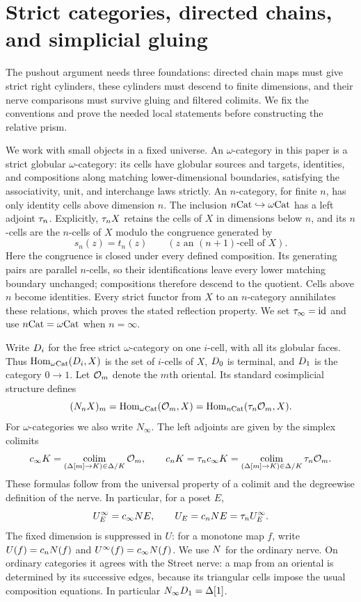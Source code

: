 \section{Strict categories, directed chains, and simplicial gluing}
\label{sec:foundations}

The pushout argument needs three foundations: directed chain maps must
give strict right cylinders, these cylinders must descend to finite
dimensions, and their nerve comparisons must survive gluing and filtered
colimits. We fix the conventions and prove the needed local statements
before constructing the relative prism.

We work with small objects in a fixed universe.  An $\omega$-category in
this paper is a strict globular $\omega$-category: its cells have globular
sources and targets, identities, and compositions along matching
lower-dimensional boundaries, satisfying the associativity, unit, and
interchange laws strictly.  An $n$-category, for finite $n$, has only
identity cells above dimension $n$.  The inclusion
$n\mathrm{Cat}\hookrightarrow\omega\mathrm{Cat}$ has a left adjoint $\tau_n$.
Explicitly, $\tau_n X$ retains the cells of $X$ in dimensions below $n$,
and its $n$-cells are the $n$-cells of $X$ modulo the congruence generated
by
\[
 s_n(z)=t_n(z)\qquad(z\text{ an }(n+1)\text{-cell of }X).
\]
Here the congruence is closed under every defined composition.  Its
generating pairs are parallel $n$-cells, so their identifications leave
every lower matching boundary unchanged; compositions therefore descend
to the quotient.  Cells above $n$ become identities.  Every strict functor from $X$ to an
$n$-category annihilates these relations, which proves the stated
reflection property.  We set $\tau_\infty=\mathrm{id}$ and use $n\mathrm{Cat}=\omega\mathrm{Cat}$
when $n=\infty$.

Write $D_{i}$ for the free strict $\omega$-category on one $i$-cell,
with all its globular faces.  Thus
$\operatorname{Hom}_{\omega\mathrm{Cat}}(D_{i},X)$ is the set of $i$-cells of $X$,
$D_{0}$ is terminal, and $D_{1}$ is the category $0\to1$.
Let $\mathcal O_{m}$ denote the $m$th oriental.  Its standard cosimplicial
structure defines
\[
 (N_n X)_m=\operatorname{Hom}_{\omega\mathrm{Cat}}(\mathcal O_{m},X)
              =\operatorname{Hom}_{n\mathrm{Cat}}(\tau_n\mathcal O_{m},X).
\]
For $\omega$-categories we also write $N_\infty$.  The left adjoints are
given by the simplex colimits
\begin{equation}\label{eq:categorification-colimit}
 c_\infty K=\operatorname*{colim}_{(\Delta[m]\to K)\in\Delta/K}\mathcal O_{m},
 \qquad
 c_nK=\tau_n c_\infty K
     =\operatorname*{colim}_{(\Delta[m]\to K)\in\Delta/K}\tau_n\mathcal O_{m}.
\end{equation}
These formulas follow from the universal property of a colimit and the
degreewise definition of the nerve.  In particular, for a poset $E$,
\[
 U^{\infty}_{E}=c_\infty N E,\qquad
 U_{E}=c_nN E=\tau_nU^{\infty}_{E}.
\]
The fixed dimension is suppressed in $U$: for a monotone map $f$,
write $U(f)=c_nN(f)$ and $U^\infty(f)=c_\infty N(f)$.
We use $N$ for the ordinary nerve.  On ordinary categories it agrees
with the Street nerve: a map from an oriental is determined by its
successive edges, because its triangular cells impose the usual
composition equations.  In particular $N_\infty D_{1}=\Delta[1]$.

